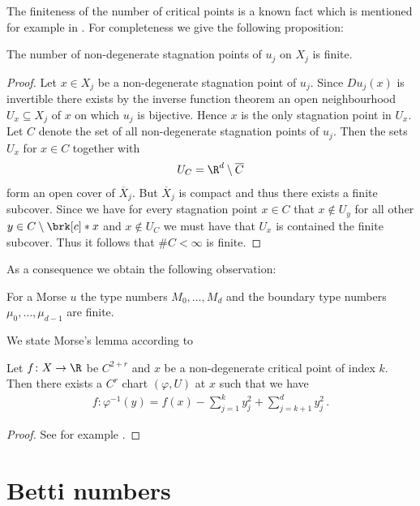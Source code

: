 The finiteness of the number of critical points is a known fact which is mentioned
for example in \cite{Morse1970}. For completeness we give the following proposition:
\begin{proposition}\label{pr:finiteness_critical_points}
  The number of non-degenerate
  stagnation points of $u_j$ on $X_j$ is finite.
\end{proposition}
\begin{proof}
  Let $x\in X_j$ be a non-degenerate stagnation point of $u_j$. Since $Du_j(x)$ is invertible there exists
  by the inverse function theorem an open neighbourhood $U_x\subseteq X_j$ of $x$ on which 
  $u_j$ is bijective. Hence $x$ is the only stagnation point in $U_x$. Let $C$ denote the set of all
  non-degenerate stagnation points of $u_j$. Then the sets $U_x$ for $x\in C$ together with
  \begin{align}
    U_C=\R^d\setminus \overline{C}
  \end{align}
  form an open cover of $\overline{X}_j$. But $\overline{X}_j$ is compact and thus there exists
  a finite subcover. Since we have for every stagnation point $x\in C$ that
  $x\not\in U_y$ for all other $y\in C\setminus\brk[c]*{x}$ and $x\not\in U_C$ we must have that $U_x$
  is contained the finite subcover. Thus it follows that $\#C<\infty$ is finite.
\end{proof}
As a consequence we obtain the following observation:
\begin{corollary}\label{co:finiteness_type_nbrs}
  For a Morse $u$ the type numbers $M_0,\dots,M_d$ and the boundary type numbers $\mu_0,\dots,\mu_{d-1}$
  are finite.
\end{corollary}


We state Morse's lemma according to \cite[§6, Lemma 1.1]{Hirsch1994}
\begin{lemma}
  Let $f\colon X\to\R$ be $C^{2+r}$ and $x$ be a non-degenerate
  critical point of index $k$. Then there exists a $C^r$ chart $(\varphi,U)$ at $x$
  such that we have
  \begin{align*}
    f\colon\varphi^{-1}(y)=f(x)-\sum_{j=1}^ky_j^2+\sum_{j=k+1}^dy_j^2\,.
  \end{align*}
\end{lemma}
\begin{proof}
  See for example \cite[§6]{Hirsch1994}.
\end{proof}


\section{Betti numbers}

